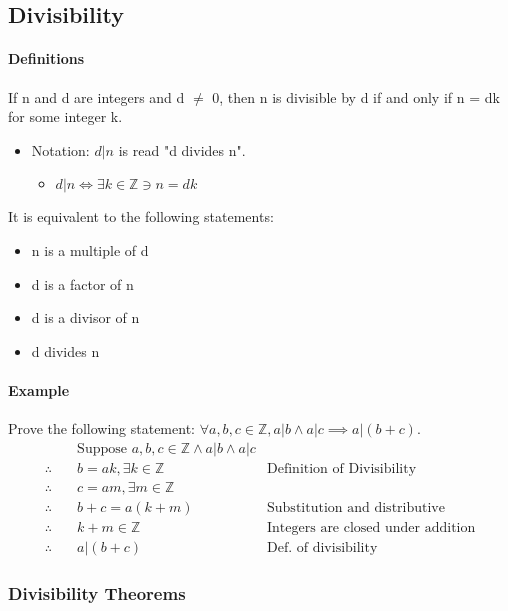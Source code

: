 \subsection{Divisibility}
\hrulefill

\paragraph*{Definitions}
If n and d are integers and d $\neq$ 0, then n is divisible by d if and only if n = dk for some integer k.
\begin{itemize}
    \item Notation: $d|n$ is read "d divides n".
    \begin{itemize}
        \item $d|n \iff \exists k \in \mathbb{Z} \ni n=dk$
    \end{itemize}
\end{itemize}

It is equivalent to the following statements:
\begin{itemize}
    \item n is a multiple of d
    \item d is a factor of n
    \item d is a divisor of n
    \item d divides n
\end{itemize}

\paragraph*{Example}
Prove the following statement: $\forall a,b,c \in \mathbb{Z}, a|b \land a|c \implies a|(b+c)$.
\begin{align*}
    & \text{Suppose } a,b,c \in \mathbb{Z} \land a|b \land a|c\\
    \therefore \quad & b=ak, \exists k \in \mathbb{Z} & \text{Definition of Divisibility}\\
    \therefore \quad & c=am, \exists m \in \mathbb{Z}\\
    \therefore \quad & b+c=a(k+m) & \text{Substitution and distributive}\\
    \therefore \quad & k+m \in \mathbb{Z} & \text{Integers are closed under addition}\\
    \therefore \quad & a|(b+c) & \text{Def. of divisibility}
\end{align*}

\subsubsection*{Divisibility Theorems}
